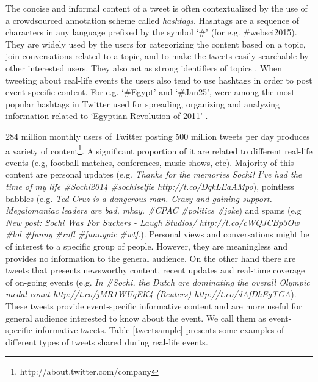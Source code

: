 The concise and informal content of a tweet is often contextualized by the use of a crowdsourced annotation scheme called \textit{hashtags}. Hashtags are a sequence of characters in any language prefixed by the symbol `\#' (for e.g. \#websci2015). They are widely used
by the users for categorizing the content based on a topic, join conversations related to a topic, and to make the tweets easily searchable by other interested users. They also act as strong identifiers of topics \cite{laniado2010making}. When tweeting about real-life events the users also tend to use hashtags in order to post event-specific content. For e.g. `\#Egypt' and `\#Jan25', were among the most popular hashtags in Twitter used for spreading, organizing and analyzing information related to `Egyptian Revolution of 2011' \cite{barrons2012suleiman}. 


284 million monthly users of Twitter posting 500 million tweets per day produces a variety of content\footnote{\tiny http://about.twitter.com/company}. A significant proportion of it are related to different real-life events (e.g, football matches, conferences, music shows, etc). Majority of this content are personal updates (e.g.  \textit{Thanks for the memories Sochi! I've had the time of my life \#Sochi2014 \#sochiselfie http://t.co/DqkLEaAMpo}), pointless babbles (e.g. \textit{Ted Cruz is a dangerous man. Crazy and gaining support. Megalomaniac leaders are bad, mkay. \#CPAC \#politics \#joke}) and spams (e.g \textit{New post: Sochi Was For Suckers - Laugh Studios/ http://t.co/cWQJCBp3Ow \#lol \#funny \#rofl \#funnypic \#wtf.}). Personal views and conversations might be of interest to a specific group of people. However, they are meaningless and provides no information to the general audience. On the other hand there are tweets that presents newsworthy content, recent updates and real-time coverage of on-going events (e.g. \textit{In \#Sochi, the Dutch are dominating the overall Olympic medal count http://t.co/jMR1WUqEK4 (Reuters) http://t.co/dAfDhEgTGA}). These tweets provide event-specific informative content and are more useful for general audience interested to know about the event. We call them as event-specific informative tweets. Table \ref{tweetsample} presents some examples of different types of tweets shared during real-life events.

